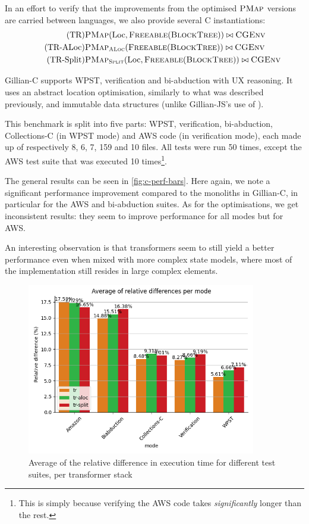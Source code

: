 In an effort to verify that the improvements from the optimised $\textsc{PMap}$ versions are carried between languages, we also provide several C instantiations:
\begin{align}
\tag{TR}       & \textsc{PMap}(\text{Loc}, \textsc{Freeable}(\textsc{BlockTree})) \bowtie \textsc{CGEnv} \\
\tag{TR-ALoc}  & \textsc{PMap}_{\textsc{ALoc}}(\textsc{Freeable}(\textsc{BlockTree})) \bowtie \textsc{CGEnv} \\
\tag{TR-Split} & \textsc{PMap}_{\textsc{Split}}(\text{Loc}, \textsc{Freeable}(\textsc{BlockTree})) \bowtie \textsc{CGEnv}
\end{align}

Gillian-C supports WPST, verification and bi-abduction with UX reasoning. It uses an abstract location optimisation, similarly to what was described previously, and immutable data structures (unlike Gillian-JS's use of ).

This benchmark is split into five parts: WPST, verification, bi-abduction, Collections-C (in WPST mode) and AWS code (in verification mode), each made up of respectively 8, 6, 7, 159 and 10 files. All tests were run 50 times, except the AWS test suite that was executed 10 times\footnote{This is simply because verifying the AWS code takes \emph{significantly} longer than the rest.}.

The general results can be seen in \autoref{fig:c-perf-bars}. Here again, we note a significant performance improvement compared to the monoliths in Gillian-C, in particular for the AWS and bi-abduction suites. As for the optimisations, we get inconsistent results: they seem to improve performance for all modes but for AWS. 

An interesting observation is that transformers seem to still yield a better performance even when mixed with more complex state models, where most of the implementation still resides in large complex elements.

\begin{figure}
	\centering
	\includegraphics[width=10cm]{figures/c-perf-bars.png}
	\caption{Average of the relative difference in execution time for different test suites, per transformer stack}
	\label{fig:c-perf-bars}
\end{figure}

